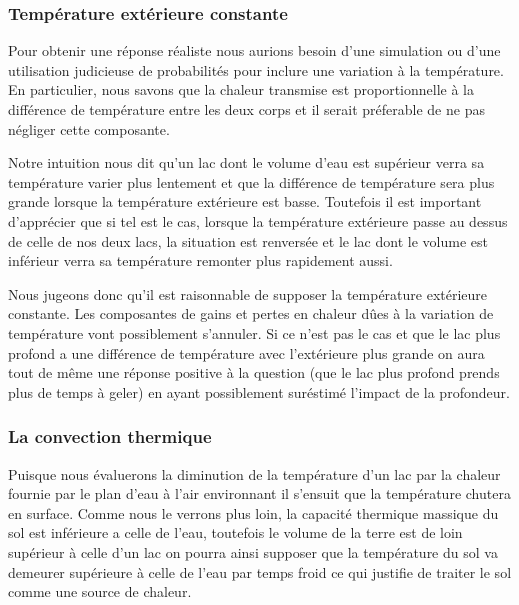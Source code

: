 \documentclass[12pt]{article}
\begin{document}
\subsubsection{Temp\'erature ext\'erieure constante}\label{TempExt}

Pour obtenir une r\'eponse r\'ealiste nous aurions besoin d'une simulation ou d'une utilisation
judicieuse de probabilit\'es pour inclure une variation \`a la temp\'erature. En particulier, nous
savons que la chaleur transmise est proportionnelle \`a la diff\'erence de temp\'erature entre les
deux corps\cite{Fourier} et il serait pr\'eferable de ne pas n\'egliger cette composante.

Notre intuition nous dit qu'un lac dont le volume d'eau est sup\'erieur verra sa temp\'erature
varier plus lentement et que la diff\'erence de temp\'erature sera plus grande lorsque la
temp\'erature ext\'erieure est basse. Toutefois il est important d'appr\'ecier que si tel est le
cas, lorsque la temp\'erature ext\'erieure passe au dessus de celle de nos deux lacs, la situation
est renvers\'ee et le lac dont le volume est inf\'erieur verra sa temp\'erature remonter plus
rapidement aussi.

Nous jugeons donc qu'il est raisonnable de supposer la temp\'erature ext\'erieure constante. Les
composantes de gains et pertes en chaleur d\^ues \`a la variation de temp\'erature vont possiblement
s'annuler. Si ce n'est pas le cas et que le lac plus profond a une diff\'erence de temp\'erature
avec l'ext\'erieure plus grande on aura tout de m\^eme une r\'eponse positive \`a la question (que
le lac plus profond prends plus de temps \`a geler) en ayant possiblement sur\'estim\'e l'impact de
la profondeur.

\subsubsection{La convection thermique}\label{Convec}

Puisque nous \'evaluerons la diminution de la temp\'erature d'un lac par la chaleur fournie par le
plan d'eau \`a l'air environnant il s'ensuit que la temp\'erature chutera en surface. Comme nous le
verrons plus loin, la capacit\'e thermique\cite{CapTherm} massique du sol est inf\'erieure a celle
de l'eau, toutefois le volume de la terre est de loin sup\'erieur \`a celle d'un lac on pourra ainsi
supposer que la temp\'erature du sol va demeurer sup\'erieure \`a celle de l'eau par temps froid ce
qui justifie de traiter le sol comme une source de chaleur.
\end{document}
